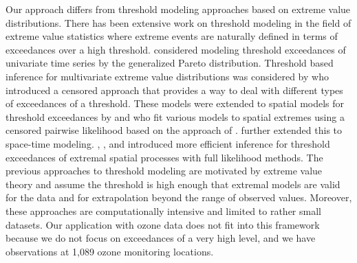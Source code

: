 \documentclass[useAMS,usenatbib,referee]{biom}
\begin{document}
Our approach differs from threshold modeling approaches based on extreme value distributions.
There has been extensive work on threshold modeling in the field of extreme value statistics where extreme events are naturally defined in terms of exceedances over a high threshold.
\citet{Davison1990} considered modeling threshold exceedances of univariate time series by the generalized Pareto distribution.
Threshold based inference for multivariate extreme value distributions was considered by \citet{Ledford1996} who introduced a censored approach that provides a way to deal with different types of exceedances of a threshold.
These models were extended to spatial models for threshold exceedances by \citet{Wadsworth2012} and \citet{Thibaud2013} who fit various models to spatial extremes using a censored pairwise likelihood \citep{Padoan2010} based on the approach of \citet{Ledford1996}.
\citet{Huser2014} further extended this to space-time modeling.
\citet{Wadsworth2014}, \citet{Engelke2015}, and \citet{Thibaud2013a} introduced more efficient inference for threshold exceedances of extremal spatial processes with full likelihood methods.
The previous approaches to threshold modeling are motivated by extreme value theory and assume the threshold is high enough that extremal models are valid for the data and for extrapolation beyond the range of observed values.
Moreover, these approaches are computationally intensive and limited to rather small datasets.
Our application with ozone data does not fit into this framework because we do not focus on exceedances of a very high level, and we have observations at 1,089 ozone monitoring locations.
\end{document}
